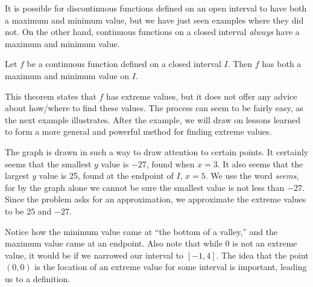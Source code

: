 It is possible for discontinuous functions defined on an open interval to have both a maximum and minimum value, but we have just seen examples where they did not. On the other hand, continuous functions on a closed interval \textit{always} have a maximum and minimum value.
 
%
{Let $f$ be a continuous function defined on a closed interval $I$. Then $f$ has both a maximum and minimum value on $I$.%
}


This theorem states that $f$ has extreme values, but it does not offer any advice about how/where to find these values. The process can seem to be fairly easy, as the next example illustrates. After the example, we will draw on lessons learned to form a more general and powerful method for finding extreme values.


{The graph is drawn in such a way to draw attention to certain points. It certainly seems that the smallest $y$ value is $-27$, found when $x=3$. It also seems that the largest $y$ value is 25, found at the endpoint of $I$, $x=5$. We use the word \textit{seems}, for by the graph alone we cannot be sure the smallest value is not less than $-27$. Since the problem asks for an approximation, we approximate the extreme values to be $25$ and $-27$.}

Notice how the minimum value came at ``the bottom of a valley,'' and the maximum value came at an endpoint. Also note that while $0$ is not an extreme value, it would be if we narrowed our interval to $[-1,4]$. The idea that the point $(0,0)$ is the location of an extreme value for some interval is important, leading us to a definition.

